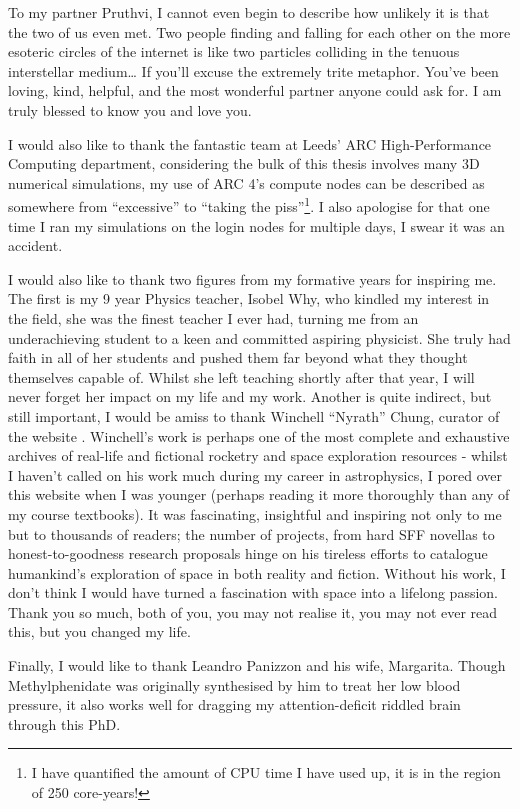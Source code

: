 \begin{acknowledgements}
To my partner Pruthvi, I cannot even begin to describe how unlikely it is that the two of us even met.
Two people finding and falling for each other on the more esoteric circles of the internet is like two particles colliding in the tenuous interstellar medium\ldots{}
If you'll excuse the extremely trite metaphor.
You've been loving, kind, helpful, and the most wonderful partner anyone could ask for.
I am truly blessed to know you and love you.

I would also like to thank the fantastic team at Leeds' ARC High-Performance Computing department, considering the bulk of this thesis involves many 3D numerical simulations, my use of ARC 4's compute nodes can be described as somewhere from ``excessive'' to ``taking the piss''\footnote{I have quantified the amount of CPU time I have used up, it is in the region of 250 core-years!}.
I also apologise for that one time I ran my simulations on the login nodes for multiple days, I swear it was an accident.

I would also like to thank two figures from my formative years for inspiring me.
The first is my 9 year Physics teacher, Isobel Why, who kindled my interest in the field, she was the finest teacher I ever had, turning me from an underachieving student to a keen and committed aspiring physicist.
She truly had faith in all of her students and pushed them far beyond what they thought themselves capable of.
Whilst she left teaching shortly after that year, I will never forget her impact on my life and my work.
Another is quite indirect, but still important, I would be amiss to thank Winchell ``Nyrath'' Chung, curator of the website .
Winchell's work is perhaps one of the most complete and exhaustive archives of real-life and fictional rocketry and space exploration resources - whilst I haven't called on his work much during my career in astrophysics, I pored over this website when I was younger (perhaps reading it more thoroughly than any of my course textbooks).
It was fascinating, insightful and inspiring not only to me but to thousands of readers; the number of projects, from hard SFF novellas to honest-to-goodness research proposals hinge on his tireless efforts to catalogue humankind's exploration of space in both reality and fiction.
Without his work, I don't think I would have turned a fascination with space into a lifelong passion.
Thank you so much, both of you, you may not realise it, you may not ever read this, but you changed my life.

Finally, I would like to thank Leandro Panizzon and his wife, Margarita.
Though Methylphenidate was originally synthesised by him to treat her low blood pressure, it also works well for dragging my attention-deficit riddled brain through this PhD.

\end{acknowledgements}


